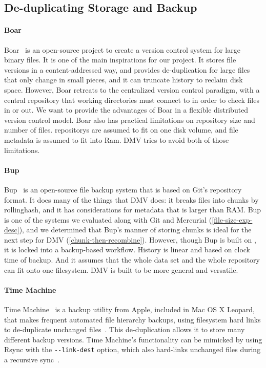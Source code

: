 \subsection{De-duplicating Storage and Backup}

\paragraph{Boar}

Boar~\cite{boar_homepage} is an open-source project to create a version control system for large binary files.
It is one of the main inspirations for our project.
It stores file versions in a content-addressed way, and provides de-duplication for large files that only change in small pieces, and it can truncate history to reclaim disk space.
However, Boar retreats to the centralized version control paradigm, with a central \gls{repository} that working directories must connect to in order to check files in or out.
We want to provide the advantages of Boar in a flexible distributed version control model.
Boar also has practical limitations on \gls{repository} size and number of files.
\glspl{repository} are assumed to fit on one disk volume, and file metadata is assumed to fit into Ram.
\gls{DMV} tries to avoid both of those limitations.


\paragraph{Bup}\label{related_bup}

Bup~\cite{bup_homepage} is an open-source file backup system that is based on Git's \gls{repository} format.
It does many of the things that \gls{DMV} does: it breaks files into chunks by \gls{rollinghash}, and it has considerations for metadata that is larger than RAM.
Bup is one of the systems we evaluated along with Git and Mercurial (\autoref{file-size-exp-desc}), and we determined that Bup's manner of storing chunks is ideal for the next step for \gls{DMV} (\autoref{chunk-then-recombine}).
However, though Bup is built on , it is locked into a backup-based workflow.
History is linear and based on clock time of backup.
And it assumes that the whole data set and the whole \gls{repository} can fit onto one filesystem.
\gls{DMV} is built to be more general and versatile.


\paragraph{Time Machine}

Time Machine~\cite{timemachine_patent} is a backup utility from Apple, included in Mac OS X Leopard, that makes frequent automated file hierarchy backups, using filesystem hard links to de-duplicate unchanged files~\cite{timemachine_magic}. This de-duplication allows it to store many different backup versions. Time Machine's functionality can be mimicked by using Rsync with the \lstinline{--link-dest} option, which also hard-links unchanged files during a recursive sync~\cite{timemachine_foreveryunix}.
